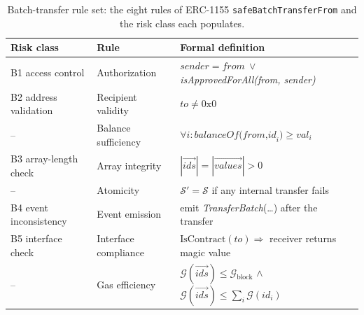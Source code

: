 \documentclass[10pt,conference]{IEEEtran}
\newcommand{\code}[1]{\texttt{#1}\xspace}
\begin{document}
\begin{table}[t]
\caption{Batch-transfer rule set: the eight rules of ERC-1155 \code{safeBatchTransferFrom} and the risk class each populates.}
\label{tab:batch}
\centering\scriptsize\setlength{\tabcolsep}{2pt}
\begin{tabular}{@{}l l >{\raggedright\arraybackslash}p{3.2cm}@{}}
\toprule
Risk class & Rule & Formal definition\\\midrule
B1 access control & Authorization & $\textit{sender}=\textit{from}\ \lor$ \textit{isApprovedForAll(from, sender)}\\
B2 address validation & Recipient validity & $\textit{to}\neq 0\text{x}0$\\
-- & Balance sufficiency & $\forall i:\textit{balanceOf(from,id}_i)\!\geq\!\textit{val}_i$\\
B3 array-length check & Array integrity & $|\overrightarrow{\textit{ids}}|=|\overrightarrow{\textit{values}}|>0$\\
-- & Atomicity & $\mathcal{S}'=\mathcal{S}$ if any internal transfer fails\\
B4 event inconsistency & Event emission & emit \textit{TransferBatch}(\ldots) after the transfer\\
B5 interface check & Interface compliance & $\mathrm{IsContract}(\textit{to})\Rightarrow$ receiver returns magic value\\
-- & Gas efficiency & $\mathcal{G}(\overrightarrow{\textit{ids}})\leq \mathcal{G}_{\text{block}}$ $\wedge$ $\mathcal{G}(\overrightarrow{\textit{ids}})\leq\sum_i\mathcal{G}(\textit{id}_i)$\\
\bottomrule
\end{tabular}
\end{table}
\end{document}

